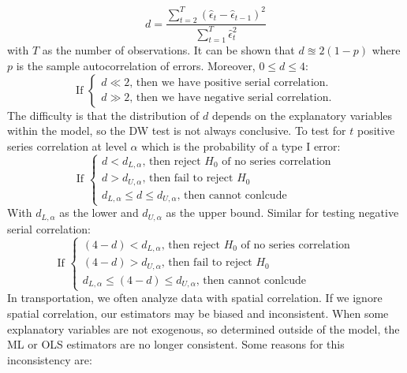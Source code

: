 		\begin{equation*}
			d=\frac{\sum\limits_{t=2}^T (\hat{\epsilon}_t - \hat{\epsilon}_{t-1})^2}{\sum\limits_{t=1}^T \hat{\epsilon}_t^2}
		\end{equation*}
		with $T$ as the number of observations. It can be shown that $d\approxeq 2(1-p)$ where $p$ is the sample autocorrelation of errors. Moreover, $0\leq d \leq 4$:
		\begin{equation*}\text{If }
			\begin{cases}
				d \ll 2\text{, then we have positive serial correlation.}\\
				d \gg 2\text{, then we have negative serial correlation.}				
			\end{cases}
		\end{equation*}
		The difficulty is that the distribution of $d$ depends on the explanatory variables within the model, so the DW test is not always conclusive. To test for $t$ positive series correlation at level $\alpha$ which is the probability of a type I error:
		\begin{equation*}\text{If }
			\begin{cases}
			d < d_{L,\alpha}\text{, then reject $H_0$ of no series correlation}\\
			d > d_{U,\alpha}\text{, then fail to reject }H_0\\		
			d_{L,\alpha}\leq d \leq d_{U,\alpha}\text{, then cannot conlcude}
			\end{cases}
		\end{equation*}
		With $d_{L,\alpha}$ as the lower and $d_{U,\alpha}$ as the upper bound. Similar for testing negative serial correlation:
		\begin{equation*}\text{If }
			\begin{cases}
			(4-d) < d_{L,\alpha}\text{, then reject $H_0$ of no series correlation}\\
			(4-d) > d_{U,\alpha}\text{, then fail to reject }H_0\\		
			d_{L,\alpha}\leq (4-d) \leq d_{U,\alpha}\text{, then cannot conlcude}
			\end{cases}
		\end{equation*}
		In transportation, we often analyze data with spatial correlation. If we ignore spatial correlation, our estimators may be biased and inconsistent.	
		When some explanatory variables are not exogenous, so determined outside of the model, the ML or OLS estimators are no longer consistent. Some reasons for this inconsistency are:
